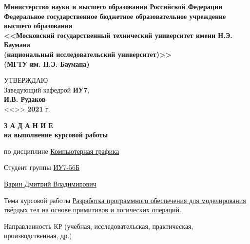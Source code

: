 \thispagestyle{empty}
\begin{center}
    \fontsize{10pt}{0.3\baselineskip}\selectfont \textbf{Министерство науки и высшего образования Российской Федерации \\ Федеральное государственное бюджетное образовательное учреждение \\ высшего образования \\ <<Московский государственный технический университет имени Н.Э. Баумана \\ (национальный исследовательский университет)>> \\ (МГТУ им. Н.Э. Баумана)}
    \makebox[\linewidth]{\rule{\textwidth}{3pt}}
    \begin{flushright}
        \fontsize{11pt}{0.5\baselineskip}\selectfont
            УТВЕРЖДАЮ \\ Заведующий кафедрой \textbf{ИУ7}, \\
            \uline{\mbox{\hspace*{2cm}}}
            \textbf{И.В. Рудаков} \\
            <<\uline{\mbox{\hspace*{1cm}}}>>
            \uline{\mbox{\hspace*{2.5cm}}}
            \textbf{2021} г.
    \end{flushright}
\end{center}


\begin{center}
    \fontsize{16pt}{0.5\baselineskip}\selectfont \textbf{З А Д А Н И Е}\\
    \fontsize{14pt}{0.5\baselineskip}\selectfont \textbf{на выполнение курсовой работы}
\end{center}

\normalsize

\begingroup
\fontsize{11pt}{0.5\baselineskip}\selectfont
\setlength{\parskip}{0.1em}
\setlength{\parindent}{0em}
по дисциплине \uline{\hfill Компьютерная графика \hfill}

Студент группы \uline{\hfill ИУ7-56Б \hfill}

\uline{\hfill Варин Дмитрий Владимирович \hfill}

Тема курсовой работы \uline{Разработка программного обеспечения для моделирования твёрдых тел на основе примитивов и логических операций.\hfill}

Направленность КР (учебная, исследовательская, практическая, производственная, др.)

